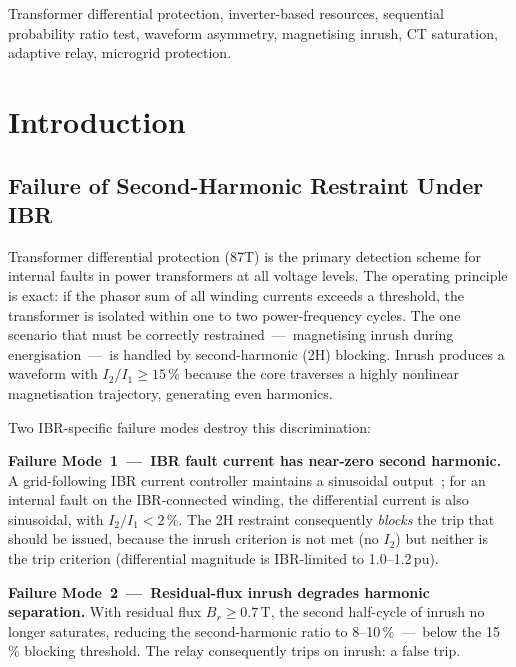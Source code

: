 \documentclass[journal,twoside,10pt]{IEEEtran}
\begin{document}
\begin{IEEEkeywords}
Transformer differential protection, inverter-based resources, sequential
probability ratio test, waveform asymmetry, magnetising inrush, CT saturation,
adaptive relay, microgrid protection.
\end{IEEEkeywords}

\section{Introduction}
\label{sec:intro}

\subsection{Failure of Second-Harmonic Restraint Under IBR}

Transformer differential protection (87T) is the primary detection scheme
for internal faults in power transformers at all voltage levels.
The operating principle is exact: if the phasor sum of all winding currents
exceeds a threshold, the transformer is isolated within one to two
power-frequency cycles.
The one scenario that must be correctly restrained~---~magnetising inrush
during energisation~---~is handled by second-harmonic (2H) blocking.
Inrush produces a waveform with $I_2/I_1 \geq 15\,\%$ because the core
traverses a highly nonlinear magnetisation trajectory, generating even
harmonics.

Two IBR-specific failure modes destroy this discrimination:

\textbf{Failure Mode~1~---~IBR fault current has near-zero second harmonic.}
A grid-following IBR current controller maintains a sinusoidal
output~\cite{Plet2011}; for an internal fault on the IBR-connected winding,
the differential current is also sinusoidal, with $I_2/I_1 < 2\,\%$.
The 2H restraint consequently \emph{blocks} the trip that should be
issued, because the inrush criterion is not met (no $I_2$) but neither is
the trip criterion (differential magnitude is IBR-limited to 1.0--1.2\,pu).

\textbf{Failure Mode~2~---~Residual-flux inrush degrades harmonic
separation.}
With residual flux $B_r \geq 0.7\,$T, the second half-cycle of inrush no
longer saturates, reducing the second-harmonic ratio to 8--10\,\%~---~below
the 15\,\% blocking threshold.
The relay consequently trips on inrush: a false trip.
\end{document}
